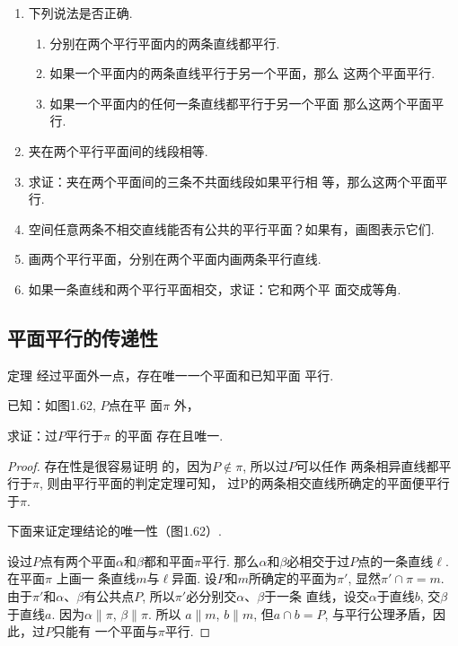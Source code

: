 \begin{ex}
\begin{enumerate}
  \item 下列说法是否正确. 
\begin{enumerate}
  \item 分别在两个平行平面内的两条直线都平行. 
  \item 如果一个平面内的两条直线平行于另一个平面，那么
    这两个平面平行. 
    \item 如果一个平面内的任何一条直线都平行于另一个平面
    那么这两个平面平行. 
\end{enumerate}

  \item 夹在两个平行平面间的线段相等. 
  \item 求证：夹在两个平面间的三条不共面线段如果平行相
  等，那么这两个平面平行. 
  \item 空间任意两条不相交直线能否有公共的平行平面？如果有，画图表示它们. 
  \item 画两个平行平面，分别在两个平面内画两条平行直线. 
  \item 如果一条直线和两个平行平面相交，求证：它和两个平
  面交成等角. 
\end{enumerate}
  \end{ex}

\subsection{平面平行的传递性}

\begin{blk}
  {定理} 经过平面外一点，存在唯一一个平面和已知平面
平行. 
\end{blk}

已知：如图1.62, $P$点在平
面$\pi$ 外，

求证：过$P$平行于$\pi$ 的平面
存在且唯一. 

\begin{proof}
存在性是很容易证明
的，因为$P\notin \pi$, 所以过$P$可以任作
两条相异直线都平行于$\pi$, 则由平行平面的判定定理可知，
过P的两条相交直线所确定的平面便平行于$\pi$.

下面来证定理结论的唯一性（图1.62）.

设过$P$点有两个平面$\alpha$和$\beta$都和平面$\pi$平行. 
那么$\alpha$和$\beta$必相交于过$P$点的一条直线$\ell$. 在平面$\pi$ 上画一
条直线$m$与$\ell$异面. 设$P$和$m$所确定的平面为$\pi'$, 显然$\pi'\cap \pi=m$. 由于$\pi'$和$\alpha$、$\beta$有公共点$P$, 所以$\pi'$必分别交$\alpha$、$\beta$于一条
直线，设交$\alpha$于直线$b$, 交$\beta$于直线$a$. 因为$\alpha\parallel \pi$, $\beta\parallel \pi$. 所以
$a\parallel m$, $b\parallel m$, 但$a\cap b=P$, 与平行公理矛盾，因此，过$P$只能有
一个平面与$\pi$平行. 
\end{proof}

